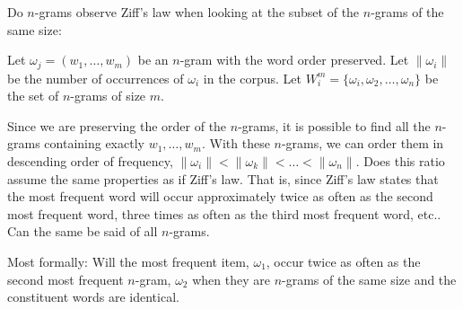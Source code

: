 \documentclass[fontsize=12pt,english]{scrartcl}
\begin{document}
Do $n$-grams observe Ziff's law when looking at the subset of the
$n$-grams of the same size:

Let $\omega_j = (w_1, \ldots, w_m)$ be an $n$-gram with the word order
preserved. Let $\|\omega_i\|$ be the number of occurrences of
$\omega_i$ in the corpus.  Let $W_i^m = \{\omega_i, \omega_2, \ldots,
\omega_n\}$ be the set of $n$-grams of size $m$.

Since we are preserving the order of the $n$-grams, it is possible to
find all the $n$-grams containing exactly $w_1, \ldots, w_m$.  With
these $n$-grams, we can order them in descending order of frequency,
$\|\omega_i\| < \|\omega_k\| <\ldots < \|\omega_n\|$.  Does this ratio
assume the same properties as if Ziff's law.  That is, since Ziff's
law states that the most frequent word will occur approximately twice
as often as the second most frequent word, three times as often as the
third most frequent word, etc.. Can the same be said of all $n$-grams.

Most formally: Will the most frequent item, $\omega_1$, occur twice as
often as the second most frequent $n$-gram, $\omega_2$ when they are
$n$-grams of the same size and the constituent words are identical.
\end{document}
